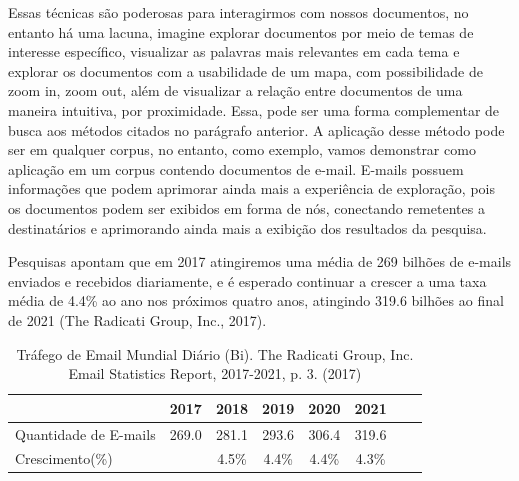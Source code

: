 \documentclass[12pt,a4paper]{article}
\begin{document}
  Essas técnicas são poderosas para interagirmos com nossos documentos, no entanto há uma lacuna, imagine explorar documentos por meio de temas de interesse específico, visualizar as palavras mais relevantes em cada tema e explorar os documentos com a usabilidade de um mapa, com possibilidade de zoom in, zoom out, além de visualizar a relação entre documentos de uma maneira intuitiva, por proximidade. Essa, pode ser uma forma complementar de busca aos métodos citados no parágrafo anterior. A aplicação desse método pode ser em qualquer corpus, no entanto, como exemplo, vamos demonstrar como aplicação em um corpus contendo documentos de e-mail.
  E-mails possuem informações que podem aprimorar ainda mais a experiência de exploração, pois os documentos podem ser exibidos em forma de nós, conectando remetentes a destinatários e aprimorando ainda mais a exibição dos resultados da pesquisa.
  
  Pesquisas apontam que em 2017 atingiremos uma média de 269 bilhões de e-mails enviados e recebidos diariamente, e é esperado continuar a crescer a uma taxa média de 4.4\% ao ano nos próximos quatro anos, atingindo 319.6 bilhões ao final de 2021 (The Radicati Group, Inc., 2017).
  
  \begin{table}[h]
    \centering
    \caption{Tráfego de Email Mundial Diário  (Bi). The Radicati Group, Inc. Email Statistics Report, 2017-2021, p. 3. (2017)}
    \begin{tabular}{l*{6}{c}r}
    &					2017 &	2018 &	2019 &	2020 &	2021 & \\
    \hline
    Quantidade de E-mails &			269.0 &	281.1 &	293.6 &	306.4 &	319.6 & \\
    Crescimento(\%) &  	&		4.5\% &	4.4\% &	4.4\% &	4.3\% & \\
    \hline
    \end{tabular}
  \end{table}
  
\end{document}
